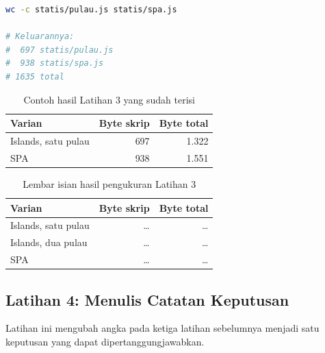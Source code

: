\begin{lstlisting}[language=bash, caption={Membandingkan ukuran skrip kedua varian, memakai \berkas{sources/chapter08/statis/}}, label={lst:c8-lat3-jalan}]
wc -c statis/pulau.js statis/spa.js

# Keluarannya:
#  697 statis/pulau.js
#  938 statis/spa.js
# 1635 total
\end{lstlisting}

\begin{table}[!htb]
  \centering
  \caption{Contoh hasil Latihan 3 yang sudah terisi}
  \label{tab:c8-lat3-contoh}
  \begin{tabularx}{\textwidth}{Xrr}
    \hline
    \textbf{Varian} & \textbf{Byte skrip} & \textbf{Byte total} \\
    \hline
    Islands, satu pulau & 697 & 1.322 \\
    \hline
    SPA & 938 & 1.551 \\
    \hline
  \end{tabularx}
\end{table}

\begin{table}[!htb]
  \centering
  \caption{Lembar isian hasil pengukuran Latihan 3}
  \label{tab:c8-lat3-hasil}
  \begin{tabularx}{\textwidth}{Xrr}
    \hline
    \textbf{Varian} & \textbf{Byte skrip} & \textbf{Byte total} \\
    \hline
    Islands, satu pulau & \dots & \dots \\
    \hline
    Islands, dua pulau & \dots & \dots \\
    \hline
    SPA & \dots & \dots \\
    \hline
  \end{tabularx}
\end{table}

\subsection*{Latihan 4: Menulis Catatan Keputusan}

Latihan ini mengubah angka pada ketiga latihan sebelumnya menjadi satu
keputusan yang dapat dipertanggungjawabkan.

